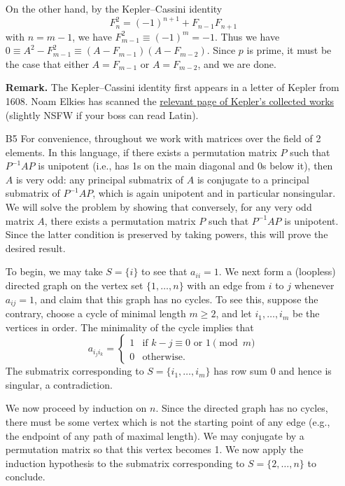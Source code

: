 \documentclass[amssymb,twocolumn,pra,10pt,aps]{revtex4-1}
\begin{document}
\begin{itemize}
On the other hand, by the Kepler--Cassini identity
\[
F_n^2 = (-1)^{n+1} + F_{n-1}F_{n+1}
\]
with $n=m-1$, we have $F_{m-1}^2 \equiv (-1)^m = -1$. Thus we have
$0 \equiv A^2 - F_{m-1}^2 \equiv (A-F_{m-1})(A-F_{m-2})$. Since $p$ is prime, it must be the case that either $A=F_{m-1}$ or $A=F_{m-2}$, and we are done.

\noindent
\textbf{Remark.}
The Kepler--Cassini identity first appears in a letter of Kepler from 1608.
Noam Elkies has scanned the \href{https://people.math.harvard.edu/~elkies/Kepler_XVI_p157.jpg}{relevant page of Kepler's collected works} (slightly NSFW if your boss can read Latin).

\item[B5]
For convenience, throughout we work with matrices over the field of 2 elements. In this language, if there exists a permutation matrix $P$ such that $P^{-1} A P$ is unipotent (i.e., has 1s on the main diagonal and 0s below it), then $A$ is very odd: any principal submatrix of $A$ is conjugate to a principal submatrix of $P^{-1} A P$, which is again unipotent and in particular nonsingular.
We will solve the problem by showing that conversely, for any very odd matrix $A$, there exists a permutation matrix $P$ such that $P^{-1} A P$ is unipotent. Since the latter condition is preserved by taking powers, this will prove the desired result.

To begin, we may take $S = \{i\}$ to see that $a_{ii} = 1$. We next form a (loopless) directed graph on the vertex set $\{1,\dots,n\}$ with an edge from $i$ to $j$ whenever $a_{ij} = 1$, and claim that this graph has no cycles.
To see this, suppose the contrary,
choose a cycle of minimal length $m \geq 2$, and let $i_1,\dots,i_m$ be the vertices in order.
The minimality of the cycle implies that
\[
a_{i_j i_k} = \begin{cases} 1 & \mbox{if } k - j \equiv 0 \mbox{ or } 1 \pmod{m} \\
0 & \mbox{otherwise}.
\end{cases}
\]
The submatrix corresponding to $S = \{i_1,\dots,i_m\}$ has row sum 0 and hence is singular, a contradiction.

We now proceed by induction on $n$.
Since the directed graph has no cycles, there must be some vertex which is not the starting point of any edge
(e.g., the endpoint of any path of maximal length).
We may conjugate by a permutation matrix so that this vertex becomes 1. We now apply the induction hypothesis to the submatrix corresponding to $S = \{2,\dots,n\}$ to conclude.


\end{itemize}
\end{document}
